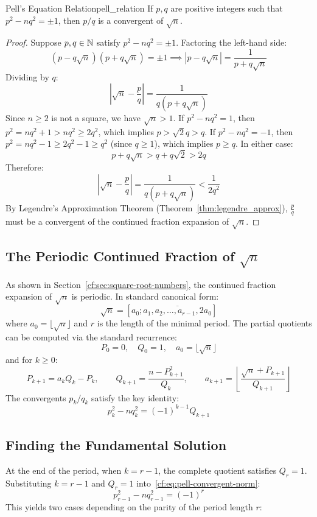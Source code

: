 \documentclass[a4paper]{article}
\begin{document}
\begin{mytheorem}{Pell's Equation Relation}{pell_relation}
  If $p, q$ are positive integers such that $p^2 - n q^2 = \pm 1$, then $p/q$ is a convergent of $\sqrt{n}$.

  \begin{proof}
    Suppose $p, q \in \mathbb{N}$ satisfy $p^2 - n q^2 = \pm 1$.
    Factoring the left-hand side:
    \[
      (p - q\sqrt{n})(p + q\sqrt{n}) = \pm 1 \implies |p - q\sqrt{n}| = \frac{1}{p + q\sqrt{n}}
    \]
    Dividing by $q$:
    \[
      \left| \sqrt{n} - \frac{p}{q} \right| = \frac{1}{q(p + q\sqrt{n})}
    \]
    Since $n \ge 2$ is not a square, we have $\sqrt{n} > 1$.
    If $p^2 - n q^2 = 1$, then $p^2 = n q^2 + 1 > n q^2 \ge 2 q^2$, which implies $p > \sqrt{2} q > q$.
    If $p^2 - n q^2 = -1$, then $p^2 = n q^2 - 1 \ge 2 q^2 - 1 \ge q^2$ (since $q \ge 1$), which implies $p \ge q$.
    In either case:
    \[
      p + q\sqrt{n} > q + q\sqrt{2} > 2q
    \]
    Therefore:
    \[
      \left| \sqrt{n} - \frac{p}{q} \right| = \frac{1}{q(p + q\sqrt{n})} < \frac{1}{2 q^2}
    \]
    By Legendre's Approximation Theorem (Theorem~\ref{thm:legendre_approx}), $\frac{p}{q}$ must be a convergent of the continued fraction expansion of $\sqrt{n}$.
  \end{proof}
\end{mytheorem}

\subsection{The Periodic Continued Fraction of \texorpdfstring{$\sqrt{n}$}{sqrt(n)}}
As shown in Section~\ref{cf:sec:square-root-numbers}, the continued fraction expansion of $\sqrt{n}$ is periodic.
In standard canonical form:
\[
  \sqrt{n} = [a_0; \overline{a_1, a_2, \dots, a_{r-1}, 2a_0}]
\]
where $a_0 = \lfloor\sqrt{n}\rfloor$ and $r$ is the length of the minimal period.
The partial quotients can be computed via the standard recurrence:
\[
  P_0 = 0, \quad Q_0 = 1, \quad a_0 = \lfloor\sqrt{n}\rfloor
\]
and for $k \ge 0$:
\[
  P_{k+1} = a_k Q_k - P_k, \qquad Q_{k+1} = \frac{n - P_{k+1}^2}{Q_k}, \qquad a_{k+1} = \left\lfloor \frac{\sqrt{n} + P_{k+1}}{Q_{k+1}} \right\rfloor
\]
The convergents $p_k/q_k$ satisfy the key identity:
\begin{equation}\label{cf:eq:pell-convergent-norm}
  p_k^2 - n q_k^2 = (-1)^{k-1} Q_{k+1}
\end{equation}

\subsection{Finding the Fundamental Solution}
At the end of the period, when $k = r - 1$, the complete quotient satisfies $Q_r = 1$.
Substituting $k = r - 1$ and $Q_r = 1$ into~\eqref{cf:eq:pell-convergent-norm}:
\[
  p_{r-1}^2 - n q_{r-1}^2 = (-1)^r
\]
This yields two cases depending on the parity of the period length $r$:
\end{document}
